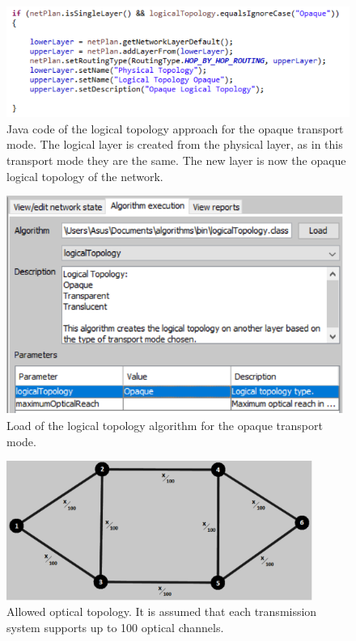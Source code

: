\begin{figure}[H]
\centering
\includegraphics[width=15cm]{sdf/heuristic/opaque_protection/figures/logical_topology_creation_opaque}
\caption{Java code of the logical topology approach for the opaque transport mode. The logical layer is created from the physical layer, as in this transport mode they are the same. The new layer is now the opaque logical topology of the network.}
\label{logical_topology_creation_opaque}
\end{figure}

\begin{figure}[H]
\centering
\includegraphics[width=11cm]{sdf/heuristic/opaque_protection/figures/logical_topology_load_opaque}
\caption{Load of the logical topology algorithm for the opaque transport mode.}
\label{logical_topology_load_opaque_protec}
\end{figure}

\begin{figure}[H]
\centering
\includegraphics[width=10cm]{sdf/heuristic/opaque_protection/figures/allowed_optical}
\caption{Allowed optical topology. It is assumed that each transmission system supports up to 100 optical channels.}
\label{allowed_optical_protec}
\end{figure}

